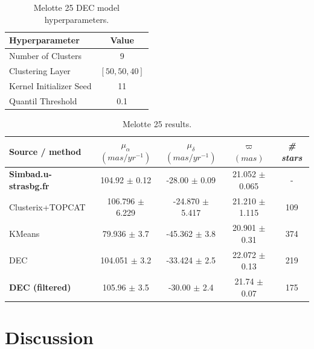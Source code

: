 \documentclass[11pt, a4paper, english]{book}
\begin{document}
\vfill

\begin{table}[h]
  \begin{center}
    \begin{tabular}{l|c}
      \textbf{Hyperparameter} & \textbf{Value} \\
      \hline
      Number of Clusters & 9 \\
      Clustering Layer & $\left[ 50, 50, 40 \right]$ \\
      Kernel Initializer Seed & 11 \\
      Quantil Threshold & 0.1 \\
    \end{tabular}
    \caption{Melotte 25 DEC model hyperparameters.}
    \label{tab:hyperparameters_melotte_25}
  \end{center}
\end{table}

\vfill

\begin{table}[h]
  \begin{center}
    \begin{tabular}{l|c|c|c|c}
      \textbf{Source / method} & \emph{$\mu_{\alpha}$ $(mas/yr^{-1})$} & \emph{$\mu_{\delta}$ $(mas/yr^{-1})$} & \emph{$\varpi$ $(mas)$} & \emph{\# stars} \\
      \hline
      \textbf{Simbad.u-strasbg.fr} & 104.92 $\pm$ 0.12 & -28.00 $\pm$ 0.09 & 21.052 $\pm$ 0.065 & - \\
      Clusterix+TOPCAT & 106.796 $\pm$ 6.229 & -24.870 $\pm$ 5.417 & 21.210 $\pm$ 1.115 & 109 \\
      KMeans & 79.936 $\pm$ 3.7 & -45.362 $\pm$ 3.8 & 20.901 $\pm$ 0.31 & 374 \\
      DEC & 104.051 $\pm$ 3.2 & -33.424 $\pm$ 2.5 & 22.072 $\pm$ 0.13 & 219 \\
      \textbf{DEC (filtered)} & 105.96 $\pm$ 3.5 & -30.00 $\pm$ 2.4 & 21.74 $\pm$ 0.07 & 175 \\
    \end{tabular}
    \caption{Melotte 25 results.}
    \label{tab:results_melotte_25}
  \end{center}
\end{table}

\vfill

\newpage

\section{Discussion}
\end{document}
